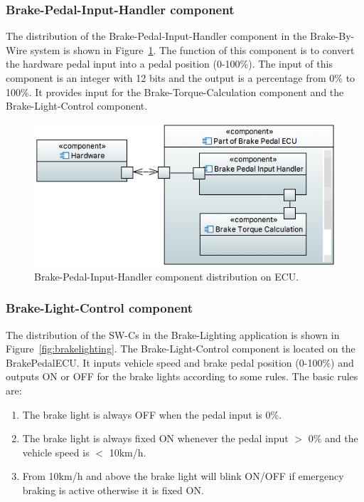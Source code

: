 \subsubsection{Brake-Pedal-Input-Handler component}
The distribution of the Brake-Pedal-Input-Handler component in the Brake-By-Wire system is shown in Figure~\ref{fig:BPIH}. The function of this component is to convert the hardware pedal input into a pedal position (0-100\%). The input of this component is an integer with 12 bits and the output is a percentage from 0\% to 100\%. It provides input for the Brake-Torque-Calculation component and the Brake-Light-Control component.


\begin{figure}[htb]
\centering
\includegraphics[width=.96\columnwidth]{figure/brakepedal1.png}
\caption{Brake-Pedal-Input-Handler component distribution on ECU.}
\label{fig:BPIH}
\end{figure}

\subsubsection{Brake-Light-Control component}

The distribution of the SW-Cs in the Brake-Lighting application is shown in Figure~\ref{fig:brakelighting}. The Brake-Light-Control component is located on the BrakePedalECU. It inputs vehicle speed and brake pedal position (0-100\%) and outputs ON or OFF for the brake lights according to some rules. The basic rules~\cite{pp} are:

\begin{enumerate}
\item The brake light is always OFF when the pedal input is 0\%.
\item The brake light is always fixed ON whenever the pedal input $>$ 0\% and the vehicle speed is $<$ 10km/h.
\item From 10km/h and above the brake light will blink ON/OFF if emergency braking is active otherwise it is fixed ON.
\end{enumerate}

